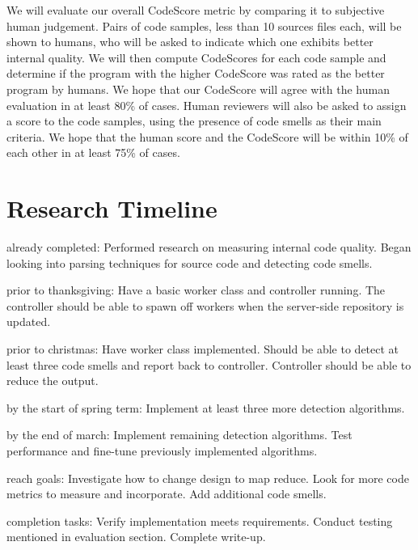 \documentclass{sig-alternate}
\begin{document}
We will evaluate our overall CodeScore metric by comparing it to subjective human judgement. Pairs of code samples, less than 10 sources files each, will be shown to humans, who will be asked to indicate which one exhibits better internal quality. We will then compute CodeScores for each code sample and determine if the program with the higher CodeScore was rated as the better program by humans. We hope that our CodeScore will agree with the human evaluation in at least 80\% of cases. Human reviewers will also be asked to assign a score to the code samples, using the presence of code smells as their main criteria. We hope that the human score and the CodeScore will be within 10\% of each other in at least 75\% of cases.

\section{Research Timeline}
\label{sec:research_timeline}
\begin{itemize*}
	\item {\sc already completed}: Performed research on measuring internal code quality. Began looking into parsing techniques for source code and detecting code smells.\vspace{3pt}
	\item {\sc prior to thanksgiving}: Have a basic worker class and controller running. The controller should be able to spawn off workers when the server-side repository is updated.\vspace{3pt}
	\item {\sc prior to christmas}: Have worker class implemented. Should be able to detect at least three code smells and report back to controller. Controller should be able to reduce the output.\vspace{3pt}
\item {\sc by the start of spring term}: Implement at least three more detection algorithms.\vspace{3pt}	
\item {\sc by the end of march}: Implement remaining detection algorithms. Test performance and fine-tune previously implemented algorithms. \vspace{3pt}
\item {\sc reach goals}: Investigate how to change design to map reduce. Look for more code metrics to measure and incorporate. Add additional code smells. \vspace{3pt}
\item {\sc completion tasks}: Verify implementation meets requirements. Conduct testing mentioned in evaluation section. Complete write-up.\vspace{3pt}
\end{itemize*}
\end{document}

